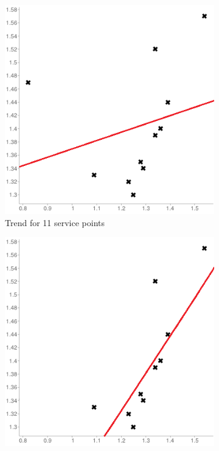 \begin{figure}[t]
       \centering
        \begin{subfigure}[b]{0.30\textwidth}
                \centering
                \includegraphics[width=\textwidth]{images/DP/scatter_plot_linear_1}
                \caption{\small Trend for 11 service points}
                \label{fig:servicea}
        \end{subfigure}
        \begin{subfigure}[b]{0.30\textwidth}
                \centering
                \includegraphics[width=\textwidth]{images/DP/scatter_plot_linear_2}

\end{subfigure}
\end{figure}

